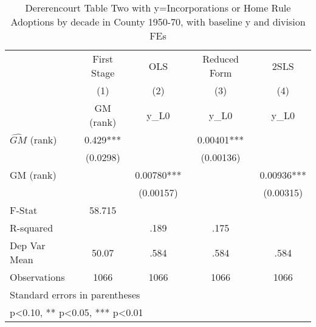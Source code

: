 \begin{table}[htbp]\centering
\def\sym#1{\ifmmode^{#1}\else\(^{#1}\)\fi}
\caption{Dererencourt Table Two with y=Incorporations or Home Rule Adoptions by decade in County 1950-70, with baseline y and division FEs}
\begin{tabular}{l*{4}{c}}
\toprule
                    & First Stage   &         OLS   &Reduced Form   &        2SLS   \\
                    &\multicolumn{1}{c}{(1)}&\multicolumn{1}{c}{(2)}&\multicolumn{1}{c}{(3)}&\multicolumn{1}{c}{(4)}\\
                    &\multicolumn{1}{c}{GM  (rank)}&\multicolumn{1}{c}{y\_L0}&\multicolumn{1}{c}{y\_L0}&\multicolumn{1}{c}{y\_L0}\\
\midrule
$\hat{GM}$ (rank)   &       0.429***&               &     0.00401***&               \\
                    &    (0.0298)   &               &   (0.00136)   &               \\
\addlinespace
GM  (rank)          &               &     0.00780***&               &     0.00936***\\
                    &               &   (0.00157)   &               &   (0.00315)   \\
\midrule
F-Stat              &      58.715   &               &               &               \\
R-squared           &               &        .189   &        .175   &               \\
Dep Var Mean        &       50.07   &        .584   &        .584   &        .584   \\
Observations        &        1066   &        1066   &        1066   &        1066   \\
\bottomrule
\multicolumn{5}{l}{\footnotesize Standard errors in parentheses}\\
\multicolumn{5}{l}{\footnotesize * p<0.10, ** p<0.05, *** p<0.01}\\
\end{tabular}
\end{table}
